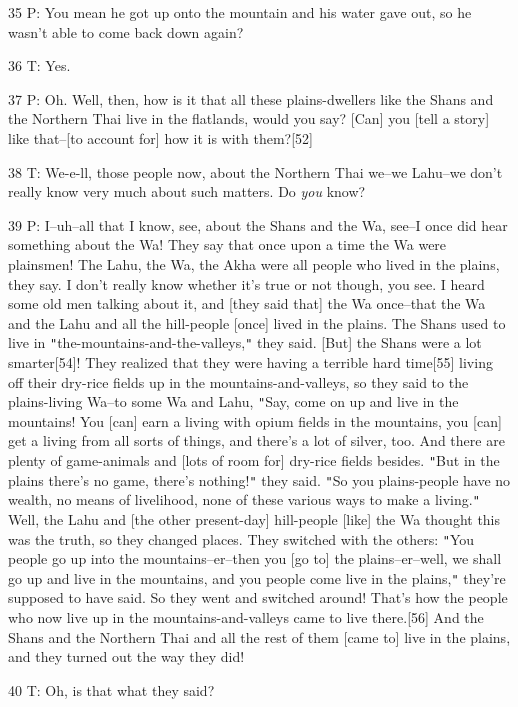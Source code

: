 35 P: You mean he got up onto the mountain and his water gave out, so he wasn't
able to come back down again?

36 T: Yes.

37 P: Oh. Well, then, how is it that all these plains-dwellers like the Shans and
the Northern Thai live in the flatlands, would you say? [Can] you [tell a story]
like that--[to account for] how it is with them?[52]

38 T: We-e-ll, those people now, about the Northern Thai we--we Lahu--we don't
really know very much about such matters. Do \textit{you} know?

39 P: I--uh--all that I know, see, about the Shans and the Wa, see--I once did
hear something about the Wa! They say that once upon a time the Wa were plainsmen!
The Lahu, the Wa, the Akha were all people who lived in the plains, they say. I
don't really know whether it's true or not though, you see. I heard some old men
talking about it, and [they said that] the Wa once--that the Wa and the Lahu and
all the hill-people [once] lived in the plains. The Shans used to live in \texttt{"}the-mountains-and-the-valleys,\texttt{"}
they said. [But] the Shans were a lot smarter[54]! They realized that they were
having a terrible hard time[55] living off their dry-rice fields up in the mountains-and-valleys,
so they said to the plains-living Wa--to some Wa and Lahu, \texttt{"}Say, come
on up and live in the mountains! You [can] earn a living with opium fields in the
mountains, you [can] get a living from all sorts of things, and there's a lot of
silver, too. And there are plenty of game-animals and [lots of room for] dry-rice
fields besides. \texttt{"}But in the plains there's no game, there's nothing!\texttt{"}
they said. \texttt{"}So you plains-people have no wealth, no means of livelihood,
none of these various ways to make a living.\texttt{"} Well, the Lahu and [the
other present-day] hill-people [like] the Wa thought this was the truth, so they
changed places. They switched with the others: \texttt{"}You people go up into
the mountains--er--then you [go to] the plains--er--well, we shall go up and live
in the mountains, and you people come live in the plains,\texttt{"} they're supposed
to have said. So they went and switched around! That's how the people who now live
up in the mountains-and-valleys came to live there.[56] And the Shans and the Northern
Thai and all the rest of them [came to] live in the plains, and they turned out
the way they did!

40 T: Oh, is that what they said?

